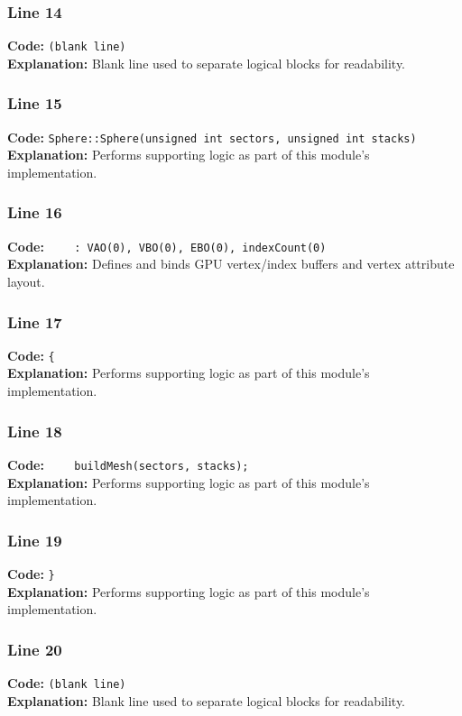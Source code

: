 \documentclass[11pt,a4paper]{article}
\begin{document}
\subsubsection*{Line 14}
\textbf{Code:} \texttt{(blank line)}\\
\textbf{Explanation:} Blank line used to separate logical blocks for readability.

\subsubsection*{Line 15}
\textbf{Code:} \verb|Sphere::Sphere(unsigned int sectors, unsigned int stacks)|\\
\textbf{Explanation:} Performs supporting logic as part of this module's implementation.

\subsubsection*{Line 16}
\textbf{Code:} \verb|    : VAO(0), VBO(0), EBO(0), indexCount(0)|\\
\textbf{Explanation:} Defines and binds GPU vertex/index buffers and vertex attribute layout.

\subsubsection*{Line 17}
\textbf{Code:} \verb|{|\\
\textbf{Explanation:} Performs supporting logic as part of this module's implementation.

\subsubsection*{Line 18}
\textbf{Code:} \verb|    buildMesh(sectors, stacks);|\\
\textbf{Explanation:} Performs supporting logic as part of this module's implementation.

\subsubsection*{Line 19}
\textbf{Code:} \verb|}|\\
\textbf{Explanation:} Performs supporting logic as part of this module's implementation.

\subsubsection*{Line 20}
\textbf{Code:} \texttt{(blank line)}\\
\textbf{Explanation:} Blank line used to separate logical blocks for readability.
\end{document}
